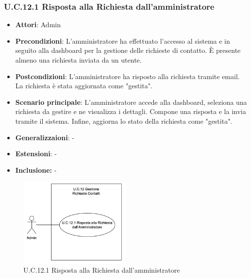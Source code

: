 \subsubsection{U.C.12.1 Risposta alla Richiesta dall'amministratore}
\begin{itemize}
    \item \textbf{Attori}: Admin
    \item \textbf{Precondizioni}: L’amministratore ha effettuato l’accesso al sistema e in seguito alla dashboard per la gestione delle richieste di contatto. È presente almeno una richiesta inviata da un utente.
    \item \textbf{Postcondizioni}: L’amministratore ha risposto alla richiesta tramite email. La richiesta è stata aggiornata come "gestita".
    \item \textbf{Scenario principale}: L’amministratore accede alla dashboard, seleziona una richiesta da gestire e ne visualizza i dettagli. Compone una risposta e la invia tramite il sistema. Infine, aggiorna lo stato della richiesta come "gestita".
    \item \textbf{Generalizzaioni}: -
    \item \textbf{Estensioni}: -
    \item \textbf{Inclusione:} -
\end{itemize}
\begin{figure}[h!]
    \centering
    \includegraphics[width=0.5\textwidth]{img/UC12-1.png}
    \caption{U.C.12.1 Risposta alla Richiesta dall'amministratore}
\end{figure}
\newpage
